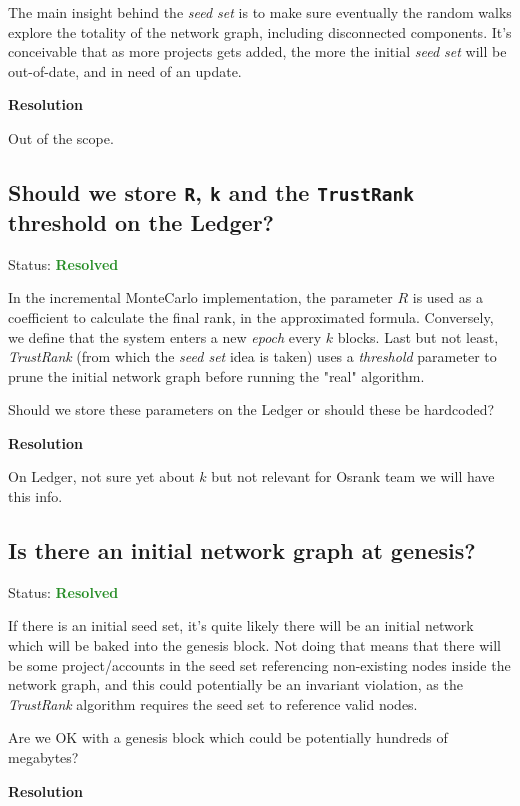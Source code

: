 \documentclass{article}
\begin{document}
The main insight behind the \textit{seed set} is to make sure eventually the
random walks explore the totality of the network graph, including disconnected
components. It's conceivable that as more projects gets added, the more the
initial \textit{seed set} will be out-of-date, and in need of an update.

\textbf{Resolution}

Out of the scope.

\subsection{Should we store \texttt{R}, \texttt{k} and the \texttt{TrustRank} threshold on the Ledger?}

Status: \textcolor{ForestGreen}{\textbf{Resolved}}

In the incremental MonteCarlo implementation, the parameter $R$ is used as a
coefficient to calculate the final rank, in the approximated formula. Conversely,
we define that the system enters a new \textit{epoch} every $k$ blocks. Last but
not least, \textit{TrustRank} (from which the \textit{seed set} idea is taken) uses
a \textit{threshold} parameter to prune the initial network graph before running the
"real" algorithm.

Should we store these parameters on the Ledger or should these be hardcoded?

\textbf{Resolution}

On Ledger, not sure yet about $k$ but not relevant for Osrank team we will
have this info.

\subsection{Is there an initial network graph at genesis?}

Status: \textcolor{ForestGreen}{\textbf{Resolved}}

If there is an initial seed set, it's quite likely there will be an initial
network which will be baked into the genesis block. Not doing that means that
there will be some project/accounts in the seed set referencing non-existing
nodes inside the network graph, and this could potentially be an invariant
violation, as the \textit{TrustRank} algorithm requires the seed set to
reference valid nodes.

Are we OK with a genesis block which could be potentially hundreds of megabytes?

\textbf{Resolution}
\end{document}

